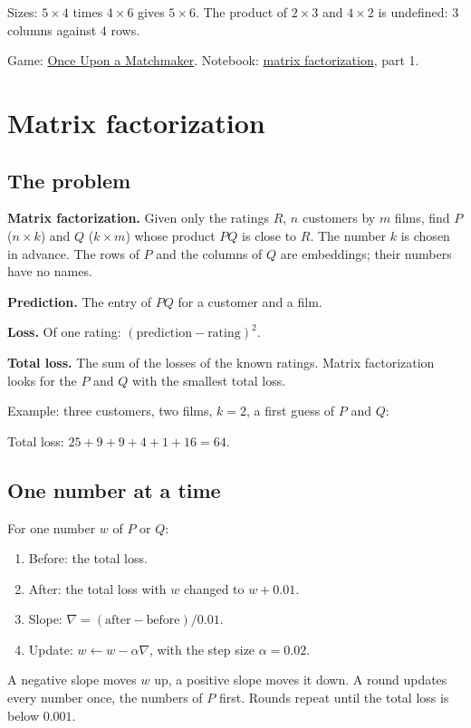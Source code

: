\documentclass[11pt,a4paper]{article}
\newcommand{\term}[1]{\textbf{#1}}
\newcommand{\PartOne}{\href{https://eth-ainit-hs26.github.io/AINIT-PAGE/viz/we2/matchmaker-part-1/}{Once Upon a Matchmaker}}
\newcommand{\NotebookMF}{\href{https://colab.research.google.com/github/eth-ainit-hs26/w2-cx-public/blob/main/02_cx_matrix_factorization_student.ipynb}{matrix factorization}}
\begin{document}
Sizes: $5 \times 4$ times $4 \times 6$ gives $5 \times 6$. The product of $2 \times 3$ and $4 \times 2$ is
undefined: $3$ columns against $4$ rows.

Game: \PartOne. Notebook: \NotebookMF, part 1.

\section{Matrix factorization}

\subsection{The problem}

\term{Matrix factorization.} Given only the ratings $R$, $n$ customers by $m$ films, find $P$ ($n \times k$) and
$Q$ ($k \times m$) whose product $PQ$ is close to $R$. The number $k$ is chosen in advance. The rows of $P$ and the
columns of $Q$ are embeddings; their numbers have no names.

\term{Prediction.} The entry of $PQ$ for a customer and a film.

\term{Loss.} Of one rating: $(\text{prediction} - \text{rating})^2$.

\term{Total loss.} The sum of the losses of the known ratings. Matrix factorization looks for the $P$ and $Q$ with
the smallest total loss.

Example: three customers, two films, $k = 2$, a first guess of $P$ and $Q$:
\begin{center}

\end{center}
Total loss: $25 + 9 + 9 + 4 + 1 + 16 = 64$.

\subsection{One number at a time}

For one number $w$ of $P$ or $Q$:
\begin{enumerate}
\item Before: the total loss.
\item After: the total loss with $w$ changed to $w + 0.01$.
\item Slope: $\nabla = (\text{after} - \text{before})/0.01$.
\item Update: $w \leftarrow w - \alpha \nabla$, with the step size $\alpha = 0.02$.
\end{enumerate}
A negative slope moves $w$ up, a positive slope moves it down. A round updates every number once, the numbers of
$P$ first. Rounds repeat until the total loss is below $0.001$.
\end{document}
